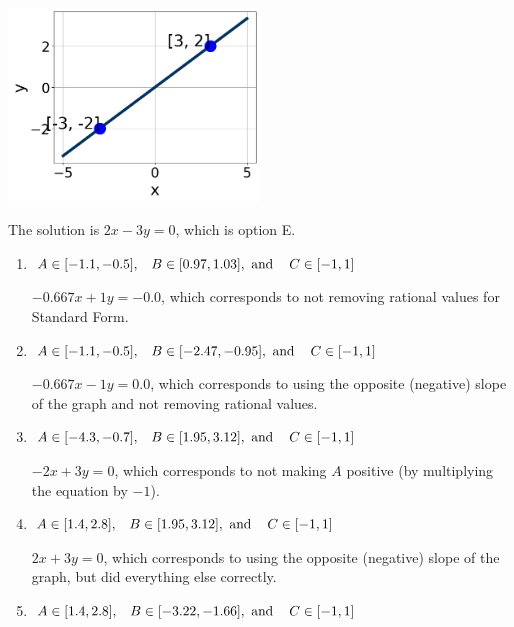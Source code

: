\documentclass{extbook}[14pt]
\begin{document}
\begin{enumerate}
{\begin{center}
    \includegraphics[width=0.5\textwidth]{../Figures/linearGraphToStandardCopyB.png}
\end{center}


The solution is \( 2x - 3y = 0 \), which is option E.\begin{enumerate}[label=\Alph*.]
\item \( A \in [-1.1, -0.5], \hspace{3mm} B \in [0.97, 1.03], \text{ and } \hspace{3mm} C \in [-1, 1] \)

 $-0.667x + 1y = -0.0$, which corresponds to not removing rational values for Standard Form.
\item \( A \in [-1.1, -0.5], \hspace{3mm} B \in [-2.47, -0.95], \text{ and } \hspace{3mm} C \in [-1, 1] \)

 $-0.667x - 1y = 0.0$, which corresponds to using the opposite (negative) slope of the graph and not removing rational values.
\item \( A \in [-4.3, -0.7], \hspace{3mm} B \in [1.95, 3.12], \text{ and } \hspace{3mm} C \in [-1, 1] \)

 $-2x + 3y = 0$, which corresponds to not making $A$ positive (by multiplying the equation by $-1$).
\item \( A \in [1.4, 2.8], \hspace{3mm} B \in [1.95, 3.12], \text{ and } \hspace{3mm} C \in [-1, 1] \)

 $2x + 3y = 0$, which corresponds to using the opposite (negative) slope of the graph, but did everything else correctly.
\item \( A \in [1.4, 2.8], \hspace{3mm} B \in [-3.22, -1.66], \text{ and } \hspace{3mm} C \in [-1, 1] \)


\end{enumerate}}
\end{enumerate}
\end{document}

